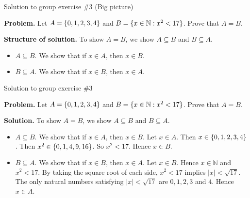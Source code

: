 \documentclass[10pt]{beamer}
\begin{document}
\begin{frame}{Solution to group exercise \#3 (Big picture)}


\textbf{Problem.} Let $A= \{ {0,1,2,3,4} \}$ and  $B= \{ {x \in \mathbb{N}: x^2<17} \}$.  Prove that $A=B$.

\vfill 
\textbf{Structure of solution.} To show $A=B$, we show $A \subseteq B$ and $B \subseteq A$.
\begin{itemize}
\item $\boxed{A \subseteq B.}$ We show that if $x \in A $, then $x \in B$.  
\item $\boxed{B \subseteq A.}$	We show that if $x \in B$, then $x \in A$.
\end{itemize}

\end{frame}


\begin{frame}{Solution to group exercise \#3}


\textbf{Problem.} Let $A= \{ {0,1,2,3,4} \}$ and  $B= \{ {x \in \mathbb{N}: x^2<17} \}$.  Prove that $A=B$.

\vfill 
\textbf{Solution.} To show $A=B$, we show $A \subseteq B$ and $B \subseteq A$.
\begin{itemize}
\item $\boxed{A \subseteq B.}$ We show that if $x \in A $, then $x \in B$.  Let $x \in A$.  Then $x \in \{ {0,1,2,3,4} \}$.  Then $x^2 \in \{ {0,1,4,9,16} \}$.  So $x^2<17$.  Hence $x \in B$.
\item $\boxed{B \subseteq A.}$	We show that if $x \in B$, then $x \in A$. Let $x \in B$.  Hence $x \in \mathbb{N}$ and $x^2<17$.  By taking the square root of each side, $x^2<17$ implies   $|x|<\sqrt{17}$.   The only natural numbers satisfying $|x|<\sqrt{17}$ are $0,1,2,3$ and $4$.  Hence $x \in A$. 
\end{itemize}

\end{frame}
\end{document}
